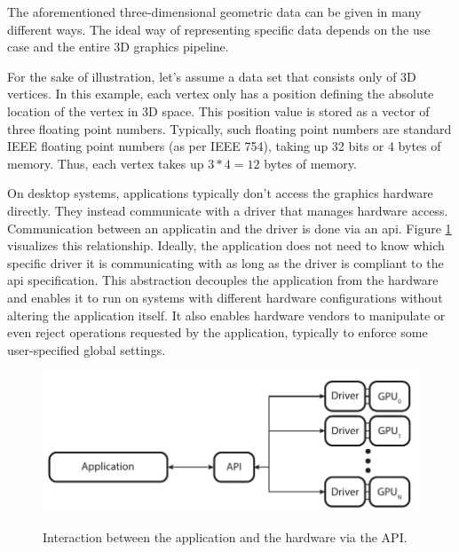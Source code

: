   The aforementioned three-dimensional geometric data can be given in many different ways. The ideal way of representing specific data depends on the use case and the entire 3D graphics pipeline.

  For the sake of illustration, let's assume a data set that consists only of 3D vertices. In this example, each vertex only has a position defining the absolute location of the vertex in 3D space. This position value is stored as a vector of three floating point numbers. Typically, such floating point numbers are standard IEEE floating point numbers (as per IEEE 754), taking up 32 bits or 4 bytes of memory. Thus, each vertex takes up $3*4 = 12$ bytes of memory.

  On desktop systems, applications typically don't access the graphics hardware directly. They instead communicate with a driver that manages hardware access. Communication between an applicatin and the driver is done via an \acrfull{api}. Figure \ref{fig:AppApiDriverOverview} visualizes this relationship. Ideally, the application does not need to know which specific driver it is communicating with as long as the driver is compliant to the \acrshort{api} specification. This abstraction decouples the application from the hardware and enables it to run on systems with different hardware configurations without altering the application itself. It also enables hardware vendors to manipulate or even reject operations requested by the application, typically to enforce some user-specified global settings. 

  \begin{figure}
    \caption{Interaction between the application and the hardware via the API.}
    \centering
    \includegraphics{Main/Images/Application_API_Driver_Overview}
    \label{fig:AppApiDriverOverview}
  \end{figure}



